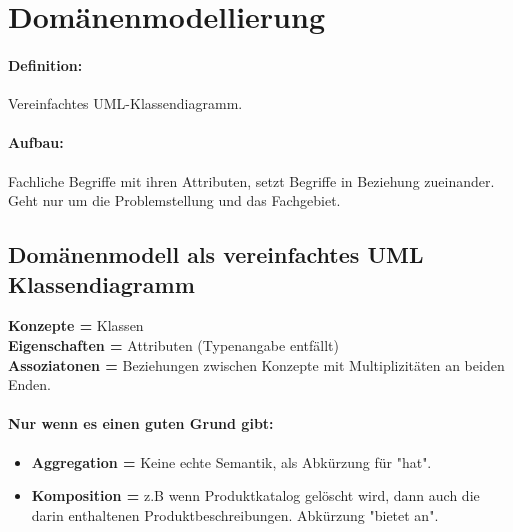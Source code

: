 \documentclass{article}
\begin{document}
\section{Domänenmodellierung}

\paragraph{Definition: } Vereinfachtes UML-Klassendiagramm.

\paragraph{Aufbau: } Fachliche Begriffe mit ihren Attributen, setzt Begriffe in Beziehung zueinander.\\
Geht nur um die Problemstellung und das Fachgebiet.


\subsection{Domänenmodell als vereinfachtes UML Klassendiagramm}

\textbf{Konzepte = }Klassen \\
\textbf{Eigenschaften = }Attributen (Typenangabe entfällt) \\
\textbf{Assoziatonen = }Beziehungen zwischen Konzepte mit Multiplizitäten an beiden Enden.\\
\paragraph{Nur wenn es einen guten Grund gibt:\\}
\begin{itemize}
	\item \textbf{Aggregation = }Keine echte Semantik, als Abkürzung für "hat".
	\item \textbf{Komposition = }z.B wenn Produktkatalog gelöscht wird, dann auch die darin enthaltenen Produktbeschreibungen. Abkürzung "bietet an".
\end{itemize}
\end{document}
